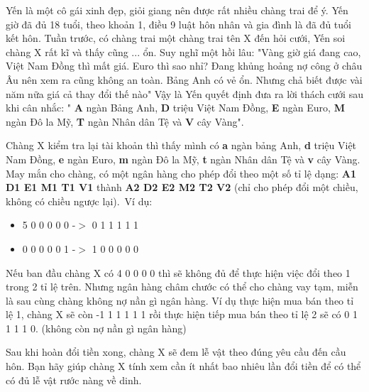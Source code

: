 Yến là một cô gái xinh đẹp, giỏi giang nên được rất nhiều chàng trai để ý. Yến giờ đã đủ 18 tuổi, theo khoản 1, điều 9 luật hôn nhân và gia đình là đã đủ tuổi kết hôn. Tuần trước, có chàng trai một chàng trai tên X đến hỏi cưới, Yến soi chàng X rất kĩ và thấy cũng ... ổn. Suy nghĩ một hồi lâu: "Vàng giờ giá đang cao, Việt Nam Đồng thì mất giá. Euro thì sao nhỉ? Đang khủng hoảng nợ công ở châu Âu nên xem ra cũng không an toàn. Bảng Anh có vẻ ổn. Nhưng chả biết được vài năm nữa giá cả thay đổi thế nào" Vậy là Yến quyết định đưa ra lời thách cưới sau khi cân nhắc: " \textbf{ A } ngàn Bảng Anh, \textbf{ D } triệu Việt Nam Đồng, \textbf{ E } ngàn Euro, \textbf{ M } ngàn Đô la Mỹ, \textbf{ T } ngàn Nhân dân Tệ và \textbf{ V } cây Vàng".

Chàng X kiểm tra lại tài khoản thì thấy mình có \textbf{ a } ngàn bảng Anh, \textbf{ d } triệu Việt Nam Đồng, \textbf{ e } ngàn Euro, \textbf{ m } ngàn Đô la Mỹ, \textbf{ t } ngàn Nhân dân Tệ và \textbf{ v } cây Vàng. May mắn cho chàng, có một ngân hàng cho phép đổi theo một số tỉ lệ dạng: \textbf{ A1 D1 E1 M1 T1 V1 } thành \textbf{ A2 D2 E2 M2 T2 V2 } (chỉ cho phép đổi một chiều, không có chiều ngược lại). Ví dụ:
\begin{itemize}
	\item 5 0 0 0 0 0 -$>$ 0 1 1 1 1 1
	\item 0 0 0 0 0 1 -$>$ 1 0 0 0 0 0
\end{itemize}

Nếu ban đầu chàng X có 4 0 0 0 0 thì sẽ không đủ để thực hiện việc đổi theo 1 trong 2 tỉ lệ trên. Nhưng ngân hàng châm chước có thể cho chàng vay tạm, miễn là sau cùng chàng không nợ nần gì ngân hàng. Ví dụ thực hiện mua bán theo tỉ lệ 1, chàng X sẽ còn -1 1 1 1 1 1 rồi thực hiện tiếp mua bán theo tỉ lệ 2 sẽ có 0 1 1 1 1 0. (không còn nợ nần gì ngân hàng)

Sau khi hoàn đổi tiền xong, chàng X sẽ đem lễ vật theo đúng yêu cầu đến cầu hôn. Bạn hãy giúp chàng X tính xem cần ít nhất bao nhiêu lần đổi tiền để có thể có đủ lễ vật rước nàng về dinh.

\